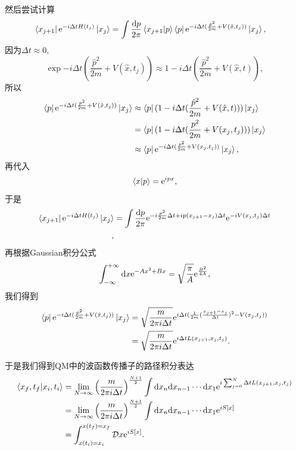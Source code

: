 然后尝试计算
\begin{align}
    \bra{x_{j+1}}\mathrm e^{-i\Delta tH(t_j)}\ket{x_j}&=\int\frac{\mathrm d p}{2\pi}\braket{x_{j+1}|p}\bra p\mathrm e^{-i\Delta t(\frac{{\hat p}^2}{2m}+V(\hat x, t_j))}\ket{x_j},
\end{align}
因为$\Delta t\approx0$, 
\begin{equation}
    \exp{-i\Delta t(\frac{{\hat p}^2}{2m}+V(\hat x, t_j))}\approx1-i\Delta t(\frac{{\hat p}^2}{2m}+V(\hat x, t)),
\end{equation}
所以
\begin{align}
    \bra p\mathrm e^{-i\Delta t(\frac{{\hat p}^2}{2m}+V(\hat x, t_j))}\ket{x_j}&\approx \bra p(1-i\Delta t(\frac{{\hat p}^2}{2m}+V(\hat x, t)))\ket{x_j}\\
    &=\bra p(1-i\Delta t(\frac{p^2}{2m}+V(x_j, t_j)))\ket{x_j}\\
    &\approx\bra p\mathrm e^{-i\Delta t(\frac{p^2}{2m}+V(x_j, t_j))}\ket{x_j},
\end{align}
再代入
\begin{equation}
    \braket{x|p}=\mathrm e^{ipx},
\end{equation}
于是
\begin{align}
    \bra{x_{j+1}}\mathrm e^{-i\Delta tH(t_j)}\ket{x_j}&=\int\frac{\mathrm d p}{2\pi}\mathrm e^{-i\frac{p^2}{2m}\Delta t+ip(x_{j+1}-x_j)\Delta t}\mathrm e^{-iV(x_j,t_j)\Delta t}\\,
\end{align}
再根据Gaussian积分公式
\begin{equation}
    \int_{-\infty}^{+\infty}\mathrm dx\mathrm e^{-Ax^2+Bx}=\sqrt{\frac\pi A}\mathrm e^{\frac{B^2}{4A}},
\end{equation}
我们得到
\begin{align}
    \bra p\mathrm e^{-i\Delta t(\frac{{\hat p}^2}{2m}+V(\hat x, t_j))}\ket{x_j}&=\sqrt{\frac m{2\pi i\Delta t}}\mathrm e^{i\Delta t(\frac1{2m}(\frac{x_{j+1}-x_j}{\Delta t})^2-V(x_j, t_j))}\\
    &=\sqrt{\frac m{2\pi i\Delta t}}\mathrm e^{i\Delta tL(x_{j+1}, x_j, t_j)}.
\end{align}

于是我们得到QM中的波函数传播子的路径积分表达
\begin{align}
    \braket{x_f, t_f|x_i, t_i}&=\lim_{N\to\infty}\left(\frac m{2\pi i\Delta t}\right)^{\frac{N+1}2}\int \mathrm dx_n\mathrm dx_{n-1}\cdots\mathrm dx_1\mathrm e^{i\sum_{j=0}^N\Delta tL(x_{j+1}, x_j, t_j)}\\
    &=\lim_{N\to\infty}\left(\frac m{2\pi i\Delta t}\right)^{\frac{N+1}2}\int \mathrm dx_n\mathrm dx_{n-1}\cdots\mathrm dx_1\mathrm e^{iS[x]}\\
    &=\int_{x(t_i)=x_i}^{x(t_f)=x_f} \mathcal Dx\mathrm e^{iS[x]}.
\end{align}

